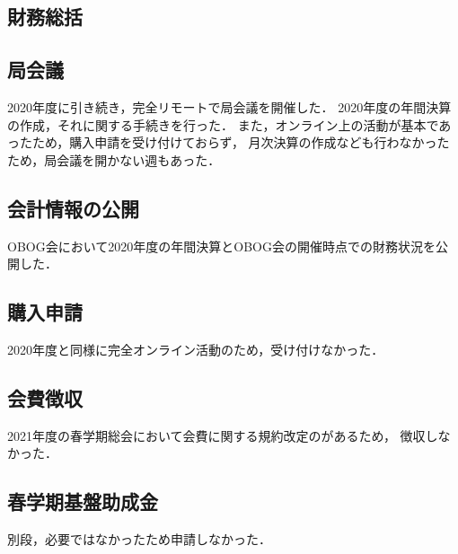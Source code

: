 \subsection*{財務総括}


\subsection*{局会議}
2020年度に引き続き，完全リモートで局会議を開催した．
2020年度の年間決算の作成，それに関する手続きを行った．
また，オンライン上の活動が基本であったため，購入申請を受け付けておらず，
月次決算の作成なども行わなかったため，局会議を開かない週もあった．

\subsection*{会計情報の公開}
OBOG会において2020年度の年間決算とOBOG会の開催時点での財務状況を公開した．

\subsection*{購入申請}
2020年度と同様に完全オンライン活動のため，受け付けなかった．

\subsection*{会費徴収}
2021年度の春学期総会において会費に関する規約改定のがあるため，
徴収しなかった．

\subsection*{春学期基盤助成金}
別段，必要ではなかったため申請しなかった．
